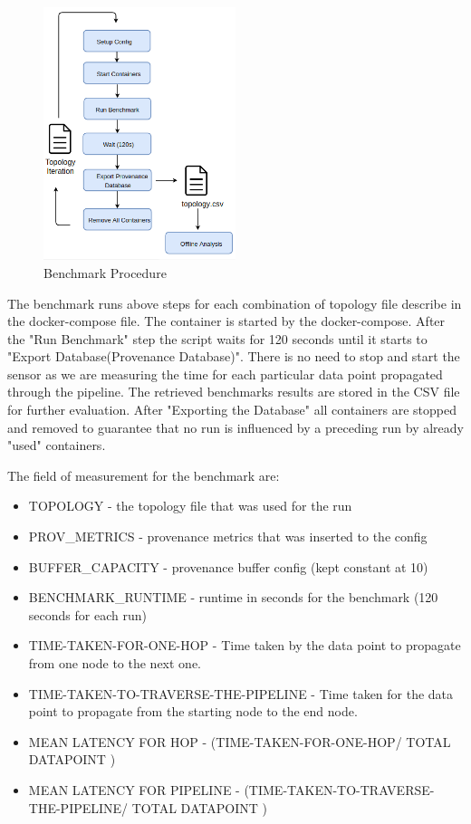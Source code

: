 \begin{figure}[H]
	\center
	\includegraphics[width=0.5\textwidth]{figures/benchmark_latency.png}
	\caption{Benchmark Procedure}
	\label{fig:benchmark_latency}
\end{figure}

The benchmark runs above steps for each combination of topology file describe in the docker-compose file. The container is started by the docker-compose. After the "Run Benchmark" step the script waits for 120 seconds until it starts to "Export Database(Provenance Database)". There is no need to stop and start the sensor as we are measuring the time for each particular data point propagated through the pipeline. The retrieved benchmarks results are stored in the CSV file for further evaluation. After "Exporting the Database" all containers are stopped and removed to guarantee that no run is influenced by a preceding run by already "used" containers.

The field of measurement for the benchmark are:
\begin{itemize}
	\item TOPOLOGY - the topology file that was used for the run
	\item PROV\_METRICS - provenance metrics that was inserted to the config
	\item BUFFER\_CAPACITY - provenance buffer config (kept constant at 10)
	\item BENCHMARK\_RUNTIME - runtime in seconds for the benchmark (120 seconds for each run)
	\item TIME-TAKEN-FOR-ONE-HOP - Time taken by the data point to propagate from one node to the next one.
	\item TIME-TAKEN-TO-TRAVERSE-THE-PIPELINE - Time taken for the data point to propagate from the starting node to the end node.
	\item MEAN LATENCY FOR HOP - (TIME-TAKEN-FOR-ONE-HOP/ TOTAL DATAPOINT )
	\item MEAN LATENCY FOR PIPELINE - (TIME-TAKEN-TO-TRAVERSE-THE-PIPELINE/ TOTAL DATAPOINT )
\end{itemize}

